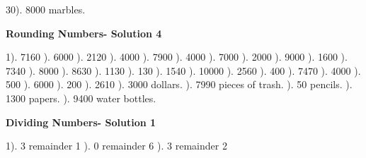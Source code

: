 \documentclass{article}%
\begin{document}
30). 8000 marbles.%
\newline%
\newpage%
\large%
\begin{center}%
\textbf{Rounding Numbers- Solution 4}%
\newline%
\end{center} \normalsize%
1). 7160%
). 6000%
). 2120%
). 4000%
). 7900%
). 4000%
). 7000%
). 2000%
). 9000%
). 1600%
). 7340%
). 8000%
). 8630%
). 1130%
). 130%
). 1540%
). 10000%
). 2560%
). 400%
). 7470%
). 4000%
). 500%
). 6000%
). 200%
). 2610%
). 3000 dollars.%
). 7990 pieces of trash.%
). 50 pencils.%
). 1300 papers.%
). 9400 water bottles.%
\newline%
\newpage%
\large%
\begin{center}%
\textbf{Dividing Numbers- Solution 1}%
\newline%
\end{center} \normalsize%
1). 3 remainder 1%
). 0 remainder 6%
). 3 remainder 2%
\newline%
\end{document}
